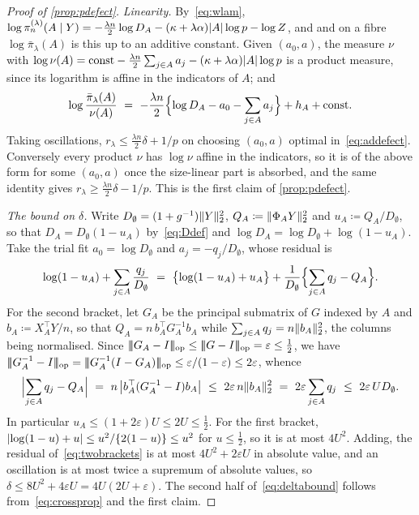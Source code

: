 \begin{proof}[Proof of \cref{prop:pdefect}]
    \emph{Linearity.} By~\eqref{eq:wlam},
    $\log\pi_n^{(\lambda)}(A\mid Y)=-\tfrac{\lambda n}2\log D_A
    -(\kappa+\lambda\alpha)\lvert A\rvert\log p-\log Z$, and
    and on a fibre $\log\bar\pi_\lambda(A)$ is this up to an additive
    constant. Given $(a_0,a)$, the measure $\nu$ with
    $\log\nu(A)=\mathrm{const}-\tfrac{\lambda n}2\sum_{j\in A}a_j
    -(\kappa+\lambda\alpha)\lvert A\rvert\log p$ is a product measure, since its
    logarithm is affine in the indicators of $A$; and
    \begin{equation*}
        \log\frac{\bar\pi_\lambda(A)}{\nu(A)}
        \ =\ -\frac{\lambda n}2\Bigl\{\log D_A-a_0-\sum_{j\in A}a_j\Bigr\}
        +h_A+\mathrm{const} .
    \end{equation*}
    Taking oscillations, $r_\lambda\leq\tfrac{\lambda n}2\delta+1/p$ on
    choosing $(a_0,a)$ optimal in~\eqref{eq:addefect}. Conversely every
    product $\nu$ has $\log\nu$ affine in the indicators, so it is of the
    above form for some $(a_0,a)$ once the size-linear part is absorbed, and
    the same identity gives $r_\lambda\geq\tfrac{\lambda n}2\delta-1/p$.
    This is the first claim of \cref{prop:pdefect}.

    \emph{The bound on $\delta$.} Write $D_\emptyset=(1+g^{-1})\lVert Y\rVert_2^{2}$,
    $Q_A\coloneq\lVert\Phi_AY\rVert_2^{2}$ and $u_A\coloneq Q_A/D_\emptyset$, so
    that $D_A=D_\emptyset(1-u_A)$ by~\eqref{eq:Ddef} and
    $\log D_A=\log D_\emptyset+\log(1-u_A)$. Take the trial fit
    $a_0=\log D_\emptyset$ and $a_j=-q_j/D_\emptyset$, whose residual is
    \begin{equation}
        \label{eq:twobrackets}
        \log(1-u_A)+\sum_{j\in A}\frac{q_j}{D_\emptyset}
        \ =\ \bigl\{\log(1-u_A)+u_A\bigr\}
        +\frac1{D_\emptyset}\Bigl\{\sum_{j\in A}q_j-Q_A\Bigr\} .
    \end{equation}
    For the second bracket, let $G_A$ be the principal submatrix of $G$
    indexed by $A$ and $b_A\coloneq X_A^{\top}Y/n$, so that
    $Q_A=n\,b_A^{\top}G_A^{-1}b_A$ while $\sum_{j\in A}q_j=n\lVert b_A\rVert_2^{2}$,
    the columns being normalised. Since $\opnorm{G_A-I}\leq\opnorm{G-I}
    =\varepsilon\leq\tfrac12$, we have
    $\opnorm{G_A^{-1}-I}=\opnorm{G_A^{-1}(I-G_A)}\leq
    \varepsilon/(1-\varepsilon)\leq2\varepsilon$, whence
    \begin{equation*}
        \Bigl|\sum_{j\in A}q_j-Q_A\Bigr|
        \ =\ n\,\bigl|b_A^{\top}(G_A^{-1}-I)b_A\bigr|
        \ \leq\ 2\varepsilon\,n\lVert b_A\rVert_2^{2}
        \ =\ 2\varepsilon\sum_{j\in A}q_j
        \ \leq\ 2\varepsilon\,U D_\emptyset .
    \end{equation*}
    In particular $u_A\leq(1+2\varepsilon)U\leq2U\leq\tfrac12$. For the first
    bracket, $\lvert\log(1-u)+u\rvert\leq u^{2}/\{2(1-u)\}\leq u^{2}$ for
    $u\leq\tfrac12$, so it is at most $4U^{2}$. Adding, the residual
    of~\eqref{eq:twobrackets} is at most $4U^{2}+2\varepsilon U$ in absolute
    value, and an oscillation is at most twice a supremum of absolute
    values, so $\delta\leq8U^{2}+4\varepsilon U=4U(2U+\varepsilon)$. The
    second half of~\eqref{eq:deltabound} follows
    from~\eqref{eq:crossprop} and the first claim.
\end{proof}

